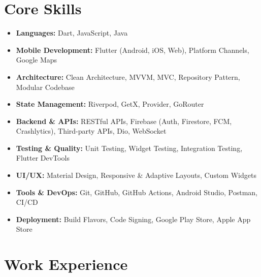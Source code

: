 \documentclass[a4paper,10pt]{article}
\begin{document}
\section{Core Skills}
\begin{itemize}[leftmargin=0.15in, label={\textbullet}, itemsep=0pt]
  \item \textbf{Languages:} Dart, JavaScript, Java
  \item \textbf{Mobile Development:} Flutter (Android, iOS, Web), Platform Channels, Google Maps
  \item \textbf{Architecture:} Clean Architecture, MVVM, MVC, Repository Pattern, Modular Codebase
  \item \textbf{State Management:} Riverpod, GetX, Provider, GoRouter
  \item \textbf{Backend \& APIs:} RESTful APIs, Firebase (Auth, Firestore, FCM, Crashlytics), Third-party APIs, Dio, WebSocket
  \item \textbf{Testing \& Quality:} Unit Testing, Widget Testing, Integration Testing, Flutter DevTools
  \item \textbf{UI/UX:} Material Design, Responsive \& Adaptive Layouts, Custom Widgets
  \item \textbf{Tools \& DevOps:} Git, GitHub, GitHub Actions, Android Studio, Postman, CI/CD
  \item \textbf{Deployment:} Build Flavors, Code Signing, Google Play Store, Apple App Store
\end{itemize}

\section{Work Experience}
\end{document}
